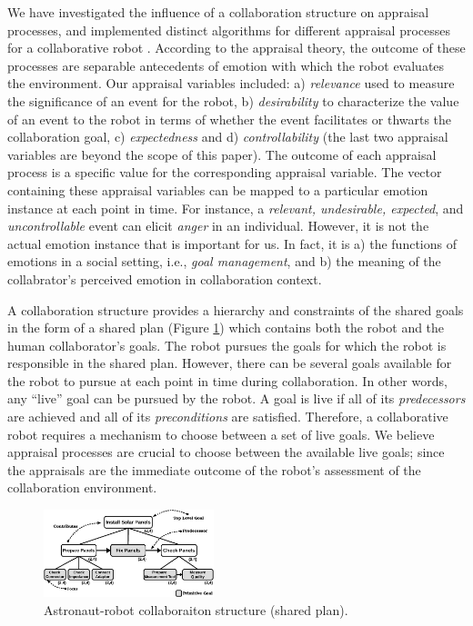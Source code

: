 \documentclass[conference]{IEEEtran}
\begin{document}
We have investigated the influence of a collaboration structure on
appraisal processes, and implemented distinct algorithms for different
appraisal processes for a collaborative robot \cite{shayganfar:appraisal}.
According to the appraisal theory, the outcome of these processes are separable
antecedents of emotion with which the robot evaluates the environment. Our
appraisal variables included: a) \textit{relevance} used to measure the
significance of an event for the robot, b) \textit{desirability} to characterize
the value of an event to the robot in terms of whether the event facilitates or
thwarts the collaboration goal, c) \textit{expectedness} and d)
\textit{controllability} (the last two appraisal variables are beyond the scope
of this paper). The outcome of each appraisal process is a specific value for
the corresponding appraisal variable. The vector containing these appraisal
variables can be mapped to a particular emotion instance at each point in time.
For instance, a \textit{relevant, undesirable, expected}, and
\textit{uncontrollable} event can elicit \textit{anger} in an individual.
However, it is not the actual emotion instance that is important for us. In
fact, it is a) the functions of emotions in a social setting, i.e., \textit{goal
management}, and b) the meaning of the collabrator's perceived emotion in
collaboration context.

A collaboration structure provides a hierarchy and constraints of the shared
goals in the form of a shared plan (Figure \ref{fig:taskModel}) which contains
both the robot and the human collaborator's goals. The robot pursues the goals
for which the robot is responsible in the shared plan. However, there can be
several goals available for the robot to pursue at each point in time during
collaboration. In other words, any ``live'' goal can be pursued by the robot. A
goal is live if all of its \textit{predecessors} are achieved and all of its
\textit{preconditions} are satisfied. Therefore, a collaborative robot requires
a mechanism to choose between a set of live goals. We believe appraisal
processes are crucial to choose between the available live goals; since the
appraisals are the immediate outcome of the robot's assessment of the
collaboration environment.

\begin{figure}[tbh]
  \centering
  \includegraphics[width=0.44\textwidth]{figure/collaborationStructure-croped.pdf}
  \vspace*{-3mm}
  \caption{{\fontsize{9}{9}\selectfont Astronaut-robot collaboraiton structure
  (shared plan).}}
  \label{fig:taskModel}
  \vspace*{-6mm}
\end{figure}
\end{document}
